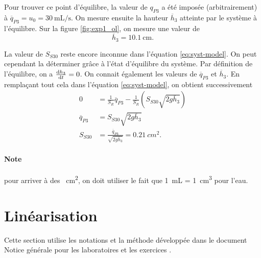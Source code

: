\documentclass[frenchb, paper=a4, fontsize=11pt]{scrartcl}
\newcommand*\eq[1]{\overline{#1}} 				%
\numberwithin{equation}{section}					%
\numberwithin{figure}{section}					%
\numberwithin{table}{section}						%
\begin{document}
Pour trouver ce point d'équilibre, la valeur de $q_{P3}$ a été imposée
(arbitrairement) à $\eq{q}_{P3} = u_0 = \SI{30}{\milli\liter\per\second}$. On
mesure ensuite la hauteur $\eq{h}_3$ atteinte
par le système à l'équilibre. Sur la figure \ref{fig:exp1_ol}, on
mesure une valeur de
\begin{equation}
	\eq{h}_3 = \SI{10.1}{\cm}.
\end{equation}

La valeur de $S_{S30}$ reste encore inconnue dans l'équation
\ref{eq:syst-model}. On peut cependant la déterminer grâce
à l'état d'équilibre du système. Par définition de
l'équilibre, on a $\frac{\operatorname{d}\! h_3}{\operatorname{d}\! t} = 0$. On connait
également les valeurs de $\eq{q}_{P3}$ et $\eq{h}_3$.
En remplaçant tout cela dans l'équation \ref{eq:syst-model}, on
obtient successivement
\begin{align}
	0 			& = \frac{1}{S_R}\eq{q}_{P3} - \frac{1}{S_R}(S_{S30}\sqrt{2g\eq{h}_3}) \\
	\eq{q}_{P3}	& = S_{S30}\sqrt{2g\eq{h}_3} \\
	S_{S30} 		& = \frac{\eq{q}_{P3}}{ \sqrt{2g\eq{h}_3}} = \SI{0.21}{cm^2}.
\end{align}

\paragraph{Note} pour arriver à des \SI{}{\cm\squared}, on doit utiliser le fait
que \SI{1}{\milli\liter} = \SI{1}{cm^3} pour l'eau.

\section{Linéarisation}
Cette section utilise les notations et la méthode développée dans le document
\og Notice générale pour les laboratoires et les exercices \fg{}. 
\end{document}
